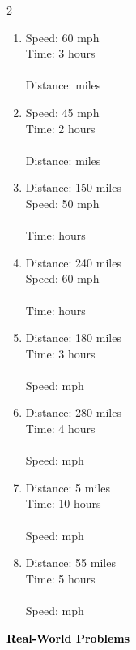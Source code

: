 \documentclass[12pt, letterpaper, fleqn]{article}
\newcommand{\blank}{\underline{\hspace{2.2cm}}}
\begin{document}
\begin{multicols}{2}
\begin{enumerate}[itemsep=2cm, leftmargin=0.6cm]
\item Speed: 60 mph\\
Time: 3 hours\\ \\
Distance: \blank \; miles

\item Speed: 45 mph\\
Time: 2 hours\\ \\
Distance: \blank \; miles

\item Distance: 150 miles\\
Speed: 50 mph\\ \\
Time: \blank \; hours

\item Distance: 240 miles\\
Speed: 60 mph\\ \\
Time: \blank \; hours

\item Distance: 180 miles\\
Time: 3 hours\\ \\
Speed: \blank \; mph

\item Distance: 280 miles\\
Time: 4 hours\\ \\
Speed: \blank \; mph

\item Distance: 5 miles\\
Time: 10 hours\\ \\
Speed: \blank \; mph

\item Distance: 55 miles\\
Time: 5 hours\\ \\
Speed: \blank \; mph

\end{enumerate}
\end{multicols}

\newpage

\begin{tcolorbox}[colback=customteal!20]
\large\textcolor{black}{\textbf{Real-World Problems}}
\end{tcolorbox}
\end{document}
